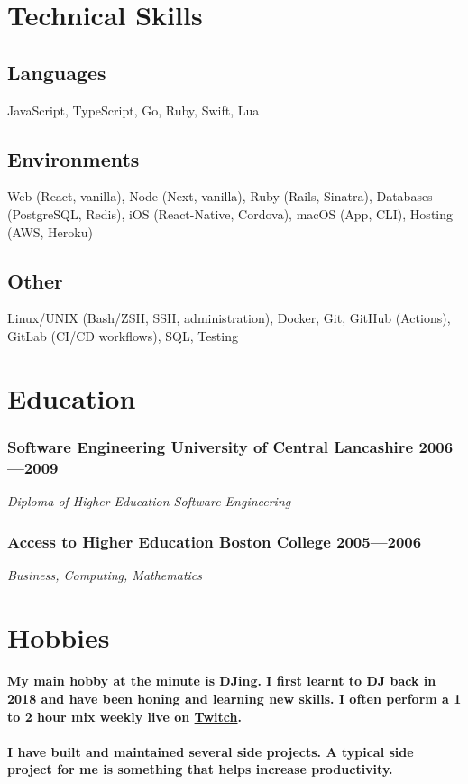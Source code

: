 \documentclass[a4paper]{article}
\newcommand{\datedsubsection}[2]{
  \subsubsection{#1 \hfill \textbf{#2}}
}
\begin{document}
\section{Technical Skills}

\subsection{Languages} JavaScript, TypeScript, Go, Ruby, Swift, Lua

\subsection{Environments} Web (React, vanilla), Node (Next, vanilla), Ruby
(Rails, Sinatra), Databases (PostgreSQL, Redis), iOS (React-Native, Cordova),
macOS (App, CLI), Hosting (AWS, Heroku)

\subsection{Other} Linux/UNIX (Bash/ZSH, SSH, administration), Docker, Git,
GitHub (Actions), GitLab (CI/CD workflows), SQL, Testing

\clearpage

\section{Education}

\datedsubsection{\textbf{Software Engineering} University of Central Lancashire}
{2006---2009}
\textit{Diploma of Higher Education Software Engineering}

\datedsubsection{\textbf{Access to Higher Education} Boston College}{2005---2006}
\textit{Business, Computing, Mathematics}

\section{Hobbies}
\paragraph{My main hobby at the minute is DJing. I first learnt to DJ back in
2018 and have been honing and learning new skills. I often perform a 1 to 2 hour
mix weekly live on \href{https://twitch.tv/iamdjriff}{Twitch}.}

\paragraph{I have built and maintained several side projects. A typical side
project for me is something that helps increase productivity.}
\end{document}
